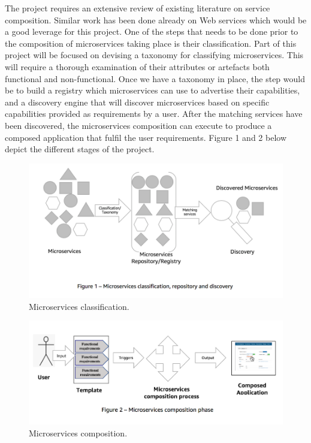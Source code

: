 \documentclass{article}
\begin{document}
The project requires an extensive review of existing literature on service composition. Similar work has been done already on Web services which would be a good leverage for this project. One of the steps that needs to be done prior to the composition of microservices taking place is their classification. Part of this project will be focused on devising a taxonomy for classifying microservices. This will require a thorough examination of their attributes or artefacts both functional and non-functional. Once we have a taxonomy in place, the step would be to build a registry which microservices can use to advertise their capabilities, and a discovery engine that will discover microservices based on specific capabilities provided as requirements by a user. After the matching services have been discovered, the microservices composition can execute to produce a composed application that fulfil the user requirements. Figure 1 and 2 below depict the different stages of the project.

\begin{figure}[!ht]
\includegraphics{microservices_classification.png}
\caption{Microservices classification.}
\end{figure}

\begin{figure}[!ht]
\includegraphics{microservices_composition.png}
\caption{Microservices composition.}
\end{figure}
\end{document}
